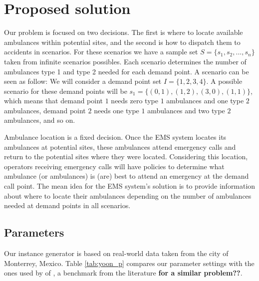 \section{Proposed solution}

Our problem is focused on two decisions. The first is where to locate available ambulances within potential sites, and the second is how to dispatch them to accidents in scenarios. For these scenarios we have a sample set $S = \{s_1, s_2, ..., s_n\}$ taken from infinite scenarios possibles. Each scenario determines the number of ambulances type 1 and type 2 needed for each demand point. A scenario can be seen as follow:
We will consider a demand point set $I = \{1, 2, 3, 4\}$. A possible scenario for these demand points will be $s_1 = \{(0, 1), (1, 2), (3, 0), (1, 1)\}$, which means that demand point $1$ needs zero type $1$ ambulances and one type $2$ ambulances, demand point $2$ needs one type $1$ ambulances and two type $2$ ambulances, and so on.

Ambulance location is a fixed decision. Once the EMS system locates its ambulances at potential sites, these ambulances attend emergency calls and return to the potential sites where they were located. Considering this location, operators receiving emergency calls will have policies to determine what ambulance (or ambulances) is (are) best to attend an emergency at the demand call point. The mean idea for the EMS system's solution is to provide information about where to locate their ambulances depending on the number of ambulances needed at demand points in all scenarios.

\subsection{Parameters} \label{instances}

Our instance generator is based on real-world data taken from the city of Monterrey, Mexico. Table \ref{tab:yoon_p} compares our parameter settings with the ones used by of \cite{yoon2021stochastic}, a benchmark from the literature \textbf{for a similar problem??}.  

